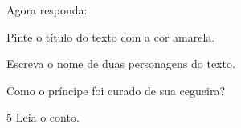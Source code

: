 Agora responda:

\begin{escolha}
\item Pinte o título do texto com a cor amarela.

\item Escreva o nome de duas personagens do texto.\\

\item Como o príncipe foi curado de sua cegueira?\\

\end{escolha}

\num{5} Leia o conto.


